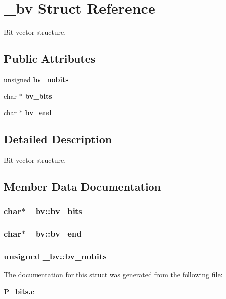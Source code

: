 \section{\_\-bv  Struct Reference}
\label{struct__bv}
Bit vector structure. 


\subsection*{Public Attributes}
\begin{CompactItemize}
\item 
unsigned {\bf bv\_\-nobits}
\item 
char $\ast$ {\bf bv\_\-bits}
\item 
char $\ast$ {\bf bv\_\-end}
\end{CompactItemize}


\subsection{Detailed Description}
Bit vector structure.



\subsection{Member Data Documentation}
\subsubsection{\setlength{\rightskip}{0pt plus 5cm}char$\ast$ \_\-bv::bv\_\-bits}\label{struct__bv_m1}


\subsubsection{\setlength{\rightskip}{0pt plus 5cm}char$\ast$ \_\-bv::bv\_\-end}\label{struct__bv_m2}


\subsubsection{\setlength{\rightskip}{0pt plus 5cm}unsigned \_\-bv::bv\_\-nobits}\label{struct__bv_m0}




The documentation for this struct was generated from the following file:\begin{CompactItemize}
\item 
{\bf P\_\-bits.c}\end{CompactItemize}
